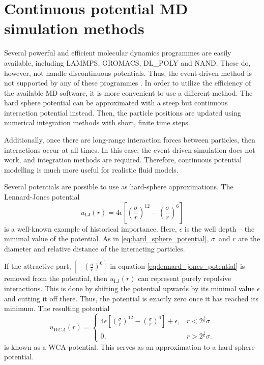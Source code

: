 \section{Continuous potential MD simulation methods}
Several powerful and efficient molecular dynamics 
programmes are easily available, including LAMMPS, 
GROMACS, DL\_POLY and NAND. %
These do, however, not handle discontinuous potentials.
Thus, the event-driven method is not supported by 
any of these programmes \cite{ref:allen:MD_sim}. In 
order to utilize the efficiency of the available MD 
software, it is more convenient to use a different 
method. The hard sphere potential can be approximated 
with a steep but continuous interaction potential 
instead. Then, the particle positions are updated 
using numerical integration methods with short, 
finite time steps.

Additionally, once there are long-range 
interaction forces between particles, then 
interactions occur at all times. In this 
case, the event driven simulation does not 
work, and integration methods are required. 
Therefore, continuous potential modelling 
is much more useful for realistic fluid models.

Several potentials are possible to use as 
hard-sphere approximations. The Lennard-Jones 
potential 
\[
    \label{eq:lennard_jones_potential}
    u_{\text{LJ}}(r) = 
        4 \epsilon \left[
            \left(\frac{\sigma}{r}\right)^{12} -
            \left(\frac{\sigma}{r}\right)^{6}
        \right]
\]
is a well-known example of historical importance.
Here, $\epsilon$ is the well depth -- the minimal value of 
the potential. As in \eqref{eq:hard_sphere_potential}, 
$\sigma$ and $r$ are the diameter and relative distance of 
the interacting particles.

If the attractive part, 
$\left[- \left(\frac{\sigma}{r}\right)^{6}\right]$
in equation \eqref{eq:lennard_jones_potential} 
is removed from the potential, then $u_{\text{LJ}}(r)$ 
can represent purely repulsive interactions. This is done 
by shifting the potential upwards by its minimal value 
$\epsilon$ and cutting it off there. Thus, the potential 
is exactly zero once it has reached its minimum. The 
resulting potential
\[
    \label{eq:WCA_potential}
    u_{WCA}(r) = 
    \begin{cases}
        4 \epsilon \left[
            \left(\frac{\sigma}{r}\right)^{12} -
            \left(\frac{\sigma}{r}\right)^{6}
        \right]
        + \epsilon,
            & r < 2^\frac{1}{6} \sigma\\
        0,  & r > 2^\frac{1}{6}\sigma.
    \end{cases}
\]
is known as a WCA-potential.
This serves as an approximation to a hard sphere potential.

